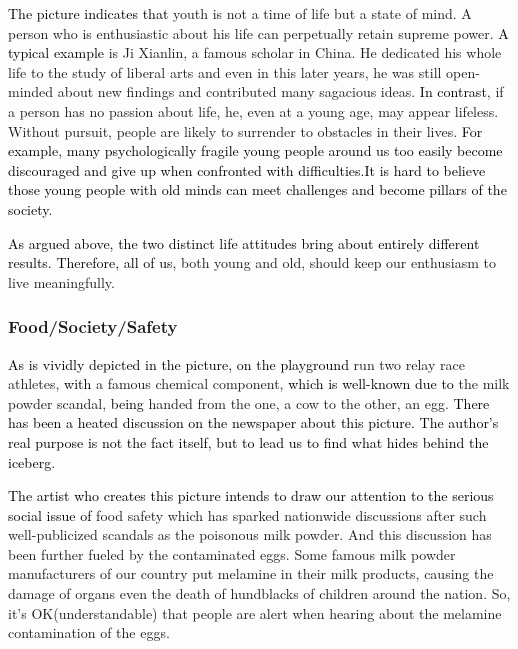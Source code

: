 \documentclass{article}
\begin{document}
\par \textcolor{black}{The picture indicates that} youth is not a time of life but a state
of mind. A person who is enthusiastic about his life can perpetually retain supreme
power. \textcolor{black}{A typical example} is Ji Xianlin, a famous scholar in China. He
dedicated his whole life to the study of liberal arts and even in this later years, he was
still open-minded about new findings and contributed many sagacious
ideas. \textcolor{black}{In contrast}, if a person has no passion about life, he, even at a
young age, may appear lifeless. Without pursuit, people are likely to surrender to
obstacles in their lives. \textcolor{black}{For example, many psychologically fragile young
  people around us too easily become discouraged and give up when confronted with
  difficulties.It is hard to believe those young people with old minds can meet challenges
  and become pillars of the society}.

\par \textcolor{black}{As argued above, the two distinct life attitudes bring about entirely
  different results. Therefore, all of us}, both young and old, should keep our enthusiasm
to live meaningfully.


\subsubsection{Food/Society/Safety}
\label{sec:foodsocietysafety}

\hspace{0.4cm} \textcolor{black}{As is vividly depicted in the picture, on the playground}
run two relay race athletes, \textcolor{black}{with} a famous chemical component,
\textcolor{black}{which is well-known due to} the milk powder scandal,
\textcolor{black}{being} handed from the one, a cow to the other, an
egg. \textcolor{black}{There has been a heated discussion on the newspaper about this
  picture. The author's real purpose is not the fact itself, but to lead us to find what
  hides behind the iceberg}.

\par \textcolor{black}{The artist who creates this picture intends to draw our attention to
  the serious social issue of} food safety which has sparked nationwide discussions after
such well-publicized scandals as the poisonous milk powder. And this discussion has been
further fueled by the contaminated eggs. Some famous milk powder manufacturers of our
country put melamine in their milk products, causing the damage of organs even the death
of hundblacks of children around the nation. So, it's OK(understandable) that people are
alert when hearing about the melamine contamination of the eggs.
\end{document}
